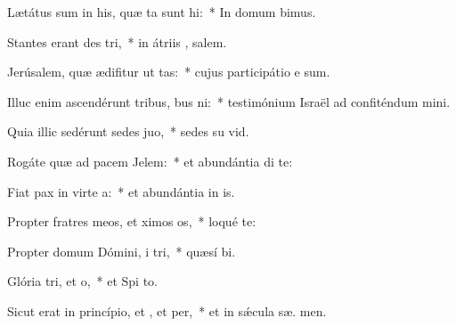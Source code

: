 \item Lætátus sum in his, quæ ta sunt hi:~* In domum  bimus.
\item Stantes erant des tri,~* in átriis , salem.
\item Jerúsalem, quæ ædifitur ut tas:~* cujus participátio e  sum.
\item Illuc enim ascendérunt tribus, bus ni:~* testimónium Israël ad confiténdum  mini.
\item Quia illic sedérunt sedes  juo,~* sedes su  vid.
\item Rogáte quæ ad pacem  Jelem:~* et abundántia di te:
\item Fiat pax in virte a:~* et abundántia in  is.
\item Propter fratres meos, et ximos os,~* loqué   te:
\item Propter domum Dómini, i tri,~* quæsí  bi.
\item Glória tri, et o,~* et Spi to.
\item Sicut erat in princípio, et , et per,~* et in sǽcula sæ. men.
